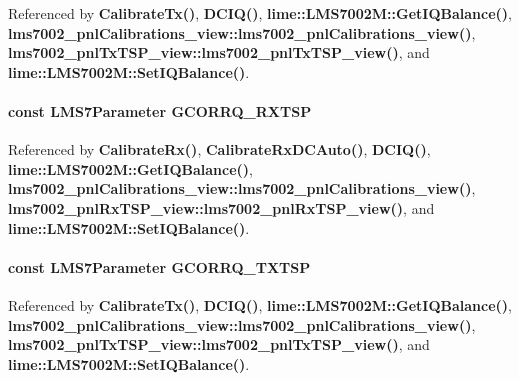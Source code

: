 Referenced by {\bf Calibrate\+Tx()}, {\bf D\+C\+I\+Q()}, {\bf lime\+::\+L\+M\+S7002\+M\+::\+Get\+I\+Q\+Balance()}, {\bf lms7002\+\_\+pnl\+Calibrations\+\_\+view\+::lms7002\+\_\+pnl\+Calibrations\+\_\+view()}, {\bf lms7002\+\_\+pnl\+Tx\+T\+S\+P\+\_\+view\+::lms7002\+\_\+pnl\+Tx\+T\+S\+P\+\_\+view()}, and {\bf lime\+::\+L\+M\+S7002\+M\+::\+Set\+I\+Q\+Balance()}.

\paragraph[{G\+C\+O\+R\+R\+Q\+\_\+\+R\+X\+T\+SP}]{\setlength{\rightskip}{0pt plus 5cm}const {\bf L\+M\+S7\+Parameter} G\+C\+O\+R\+R\+Q\+\_\+\+R\+X\+T\+SP}\label{LMS7002M__parameters__compact_8h_ac22dfa8c5ce15996dfe59da9b68dd5cb}


Referenced by {\bf Calibrate\+Rx()}, {\bf Calibrate\+Rx\+D\+C\+Auto()}, {\bf D\+C\+I\+Q()}, {\bf lime\+::\+L\+M\+S7002\+M\+::\+Get\+I\+Q\+Balance()}, {\bf lms7002\+\_\+pnl\+Calibrations\+\_\+view\+::lms7002\+\_\+pnl\+Calibrations\+\_\+view()}, {\bf lms7002\+\_\+pnl\+Rx\+T\+S\+P\+\_\+view\+::lms7002\+\_\+pnl\+Rx\+T\+S\+P\+\_\+view()}, and {\bf lime\+::\+L\+M\+S7002\+M\+::\+Set\+I\+Q\+Balance()}.

\paragraph[{G\+C\+O\+R\+R\+Q\+\_\+\+T\+X\+T\+SP}]{\setlength{\rightskip}{0pt plus 5cm}const {\bf L\+M\+S7\+Parameter} G\+C\+O\+R\+R\+Q\+\_\+\+T\+X\+T\+SP}\label{LMS7002M__parameters__compact_8h_ab6db9cf9405d604b54f333d1270da95d}


Referenced by {\bf Calibrate\+Tx()}, {\bf D\+C\+I\+Q()}, {\bf lime\+::\+L\+M\+S7002\+M\+::\+Get\+I\+Q\+Balance()}, {\bf lms7002\+\_\+pnl\+Calibrations\+\_\+view\+::lms7002\+\_\+pnl\+Calibrations\+\_\+view()}, {\bf lms7002\+\_\+pnl\+Tx\+T\+S\+P\+\_\+view\+::lms7002\+\_\+pnl\+Tx\+T\+S\+P\+\_\+view()}, and {\bf lime\+::\+L\+M\+S7002\+M\+::\+Set\+I\+Q\+Balance()}.

